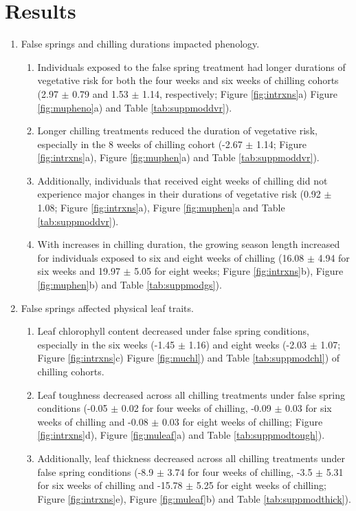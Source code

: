 \documentclass{article}\usepackage[]{graphicx}\usepackage[]{color}
\begin{document}
\section*{Results}
\begin{enumerate}
\item False springs and chilling durations impacted phenology. 
  \begin{enumerate}
  \item Individuals exposed to the false spring treatment had longer durations of vegetative risk for both the four weeks and six weeks of chilling cohorts (2.97 $\pm$ 0.79 and 1.53 $\pm$ 1.14, respectively; Figure \ref{fig:intrxns}a) Figure \ref{fig:mupheno}a) and Table \ref{tab:suppmoddvr}).
  \item Longer chilling treatments reduced the duration of vegetative risk, especially in the 8 weeks of chilling cohort (-2.67 $\pm$ 1.14; Figure \ref{fig:intrxns}a), Figure \ref{fig:muphen}a) and Table \ref{tab:suppmoddvr}).
  \item Additionally, individuals that received eight weeks of chilling did not experience major changes in their durations of vegetative risk (0.92 $\pm$ 1.08; Figure \ref{fig:intrxns}a), Figure \ref{fig:muphen}a and Table \ref{tab:suppmoddvr}). 
  \item With increases in chilling duration, the growing season length increased for individuals exposed to six and eight weeks of chilling (16.08 $\pm$ 4.94 for six weeks and 19.97 $\pm$ 5.05 for eight weeks; Figure \ref{fig:intrxns}b), Figure \ref{fig:muphen}b) and Table \ref{tab:suppmodgs}).
  \end{enumerate}
  
\item False springs affected physical leaf traits.
  \begin{enumerate}
  \item Leaf chlorophyll content decreased under false spring conditions, especially in the six weeks (-1.45 $\pm$ 1.16) and eight weeks (-2.03 $\pm$ 1.07; Figure \ref{fig:intrxns}c) Figure \ref{fig:muchl}) and Table \ref{tab:suppmodchl}) of chilling cohorts.
  \item Leaf toughness decreased across all chilling treatments under false spring conditions (-0.05 $\pm$ 0.02 for four weeks of chilling, -0.09 $\pm$ 0.03 for six weeks of chilling and -0.08 $\pm$ 0.03 for eight weeks of chilling; Figure \ref{fig:intrxns}d), Figure \ref{fig:muleaf}a) and Table \ref{tab:suppmodtough}).
  \item Additionally, leaf thickness decreased across all chilling treatments under false spring conditions (-8.9 $\pm$ 3.74 for four weeks of chilling, -3.5 $\pm$ 5.31 for six weeks of chilling and -15.78 $\pm$ 5.25 for eight weeks of chilling; Figure \ref{fig:intrxns}e), Figure \ref{fig:muleaf}b) and Table \ref{tab:suppmodthick}).
  \end{enumerate}
  

\end{enumerate}
\end{document}
